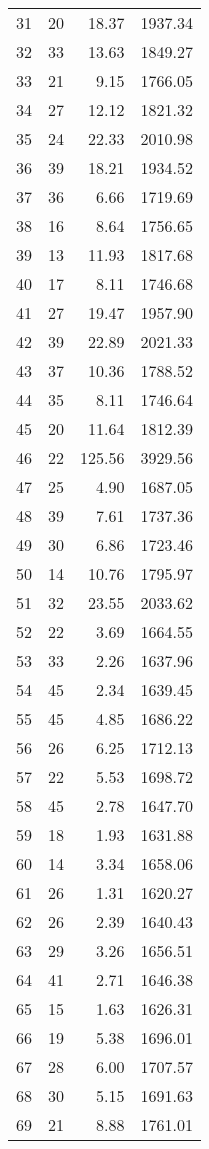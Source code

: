 \begin{appendix}
\begin{longtable}{rrrr}
31 & 20 & 18.37 & 1937.34 \\
32 & 33 & 13.63 & 1849.27 \\
33 & 21 & 9.15 & 1766.05 \\
34 & 27 & 12.12 & 1821.32 \\
35 & 24 & 22.33 & 2010.98 \\
36 & 39 & 18.21 & 1934.52 \\
37 & 36 & 6.66 & 1719.69 \\
38 & 16 & 8.64 & 1756.65 \\
39 & 13 & 11.93 & 1817.68 \\
40 & 17 & 8.11 & 1746.68 \\
41 & 27 & 19.47 & 1957.90 \\
42 & 39 & 22.89 & 2021.33 \\
43 & 37 & 10.36 & 1788.52 \\
44 & 35 & 8.11 & 1746.64 \\
45 & 20 & 11.64 & 1812.39 \\
46 & 22 & 125.56 & 3929.56 \\
47 & 25 & 4.90 & 1687.05 \\
48 & 39 & 7.61 & 1737.36 \\
49 & 30 & 6.86 & 1723.46 \\
50 & 14 & 10.76 & 1795.97 \\
51 & 32 & 23.55 & 2033.62 \\
52 & 22 & 3.69 & 1664.55 \\
53 & 33 & 2.26 & 1637.96 \\
54 & 45 & 2.34 & 1639.45 \\
55 & 45 & 4.85 & 1686.22 \\
56 & 26 & 6.25 & 1712.13 \\
57 & 22 & 5.53 & 1698.72 \\
58 & 45 & 2.78 & 1647.70 \\
59 & 18 & 1.93 & 1631.88 \\
60 & 14 & 3.34 & 1658.06 \\
61 & 26 & 1.31 & 1620.27 \\
62 & 26 & 2.39 & 1640.43 \\
63 & 29 & 3.26 & 1656.51 \\
64 & 41 & 2.71 & 1646.38 \\
65 & 15 & 1.63 & 1626.31 \\
66 & 19 & 5.38 & 1696.01 \\
67 & 28 & 6.00 & 1707.57 \\
68 & 30 & 5.15 & 1691.63 \\
69 & 21 & 8.88 & 1761.01 \\
\bottomrule
\end{longtable}


\end{appendix}
